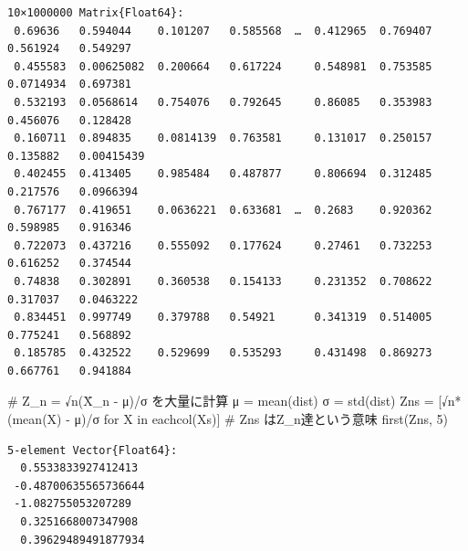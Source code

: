 \documentclass[
  letterpaper,
  DIV=11,
  numbers=noendperiod]{scrartcl}
\newenvironment{Shaded}{\begin{snugshade}}{\end{snugshade}}
\newcommand{\CommentTok}[1]{\textcolor[rgb]{0.37,0.37,0.37}{#1}}
\newcommand{\ConstantTok}[1]{\textcolor[rgb]{0.56,0.35,0.01}{#1}}
\newcommand{\FloatTok}[1]{\textcolor[rgb]{0.68,0.00,0.00}{#1}}
\newcommand{\FunctionTok}[1]{\textcolor[rgb]{0.28,0.35,0.67}{#1}}
\newcommand{\KeywordTok}[1]{\textcolor[rgb]{0.00,0.23,0.31}{#1}}
\newcommand{\NormalTok}[1]{\textcolor[rgb]{0.00,0.23,0.31}{#1}}
\newcommand{\OperatorTok}[1]{\textcolor[rgb]{0.37,0.37,0.37}{#1}}
\newcommand{\SpecialCharTok}[1]{\textcolor[rgb]{0.37,0.37,0.37}{#1}}
\newcommand{\StringTok}[1]{\textcolor[rgb]{0.13,0.47,0.30}{#1}}
\begin{document}
\begin{verbatim}
10×1000000 Matrix{Float64}:
 0.69636   0.594044    0.101207   0.585568  …  0.412965  0.769407  0.561924   0.549297
 0.455583  0.00625082  0.200664   0.617224     0.548981  0.753585  0.0714934  0.697381
 0.532193  0.0568614   0.754076   0.792645     0.86085   0.353983  0.456076   0.128428
 0.160711  0.894835    0.0814139  0.763581     0.131017  0.250157  0.135882   0.00415439
 0.402455  0.413405    0.985484   0.487877     0.806694  0.312485  0.217576   0.0966394
 0.767177  0.419651    0.0636221  0.633681  …  0.2683    0.920362  0.598985   0.916346
 0.722073  0.437216    0.555092   0.177624     0.27461   0.732253  0.616252   0.374544
 0.74838   0.302891    0.360538   0.154133     0.231352  0.708622  0.317037   0.0463222
 0.834451  0.997749    0.379788   0.54921      0.341319  0.514005  0.775241   0.568892
 0.185785  0.432522    0.529699   0.535293     0.431498  0.869273  0.667761   0.941884
\end{verbatim}

\begin{Shaded}
\begin{Highlighting}[]
\CommentTok{\# Z\_n = √n(X̄\_n {-} μ)/σ を大量に計算}
\NormalTok{μ }\OperatorTok{=} \FunctionTok{mean}\NormalTok{(dist)}
\NormalTok{σ }\OperatorTok{=} \FunctionTok{std}\NormalTok{(dist)}
\NormalTok{Zns }\OperatorTok{=}\NormalTok{ [}\FunctionTok{√n*}\NormalTok{(}\FunctionTok{mean}\NormalTok{(X) }\OperatorTok{{-}}\NormalTok{ μ)}\OperatorTok{/}\NormalTok{σ for X }\KeywordTok{in} \FunctionTok{eachcol}\NormalTok{(Xs)] }\CommentTok{\# Zns はZ\_n達という意味}
\FunctionTok{first}\NormalTok{(Zns, }\FloatTok{5}\NormalTok{)}
\end{Highlighting}
\end{Shaded}

\begin{verbatim}
5-element Vector{Float64}:
  0.5533833927412413
 -0.48700635565736644
 -1.082755053207289
  0.3251668007347908
  0.39629489491877934
\end{verbatim}

\begin{Shaded}
\end{Shaded}
\end{document}
